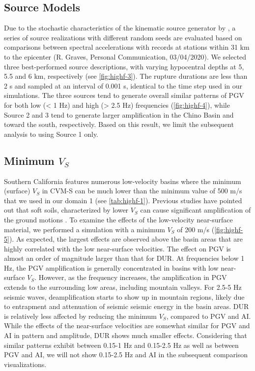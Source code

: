 \subsection{Source Models}
Due to the stochastic characteristics of the kinematic source generator by \citet{gravesKinematicGroundMotion2016}, a series of source realizations with different random seeds are evaluated based on comparisons between spectral accelerations with records at stations within 31 km to the epicenter (R. Graves, Personal Communication, 03/04/2020). We selected three best-performed source descriptions, with varying hypocentral depths at 5, 5.5 and 6 km, respectively (see \cref{fig:highf-3}). The rupture durations are less than 2 s and sampled at an interval of 0.001 s, identical to the time step used in our simulations. The three sources tend to generate overall similar patterns of PGV for both low (< 1 Hz) and high (> 2.5 Hz) frequencies (\cref{fig:highf-4}), while Source 2 and 3 tend to generate larger amplification in the Chino Basin and toward the south, respectively. Based on this result, we limit the subsequent analysis to using Source 1 only.

\subsection{Minimum \textbf{$V_S$}}
Southern California features numerous low-velocity basins where the minimum (surface) $V_S$ in CVM-S can be much lower than the minimum value of 500 m/s that we used in our domain 1 (see \cref{tab:highf-1}). Previous studies have pointed out that soft soils, characterized by lower $V_S$ can cause significant amplification of the ground motions . To examine the effects of the low-velocity near-surface material, we performed a simulation with a minimum $V_S$ of 200 m/s (\cref{fig:highf-5}). As expected, the largest effects are observed above the basin areas that are highly correlated with the low near-surface velocities. The effect on PGV is almost an order of magnitude larger than that for DUR. At frequencies below 1 Hz, the PGV amplification is generally concentrated in basins with low near-surface $V_S$. However, as the frequency increases, the amplification in PGV extends to the surrounding low areas, including mountain valleys. For 2.5-5 Hz seismic waves, deamplification starts to show up in mountain regions, likely due to entrapment and attenuation of seismic seismic energy in the basin areas. DUR is relatively less affected by reducing the minimum $V_S$, compared to PGV and AI. While the effects of the near-surface velocities are somewhat similar for PGV and AI in pattern and amplitude, DUR shows much smaller effects. Considering that similar patterns exhibit between 0.15-1 Hz and 0.15-2.5 Hz as well as between PGV and AI, we will not show 0.15-2.5 Hz and AI in the subsequent comparison visualizations.

